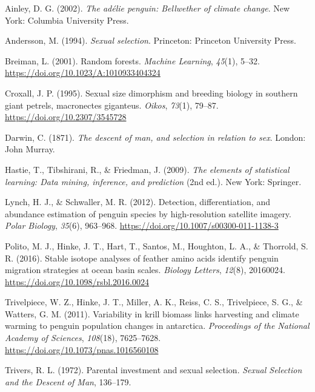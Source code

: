 \documentclass[
]{agujournal2019}
\newlength{\cslhangindent}
\newenvironment{CSLReferences}[2] %
 {\begin{list}{}{%
  \setlength{\itemindent}{0pt}
  \setlength{\leftmargin}{0pt}
  \setlength{\parsep}{0pt}
  \ifodd #1
   \setlength{\leftmargin}{\cslhangindent}
   \setlength{\itemindent}{-1\cslhangindent}
  \fi
  \setlength{\itemsep}{#2\baselineskip}}}
 {\end{list}}
\begin{document}
\label{refs}
\begin{CSLReferences}{1}{0}
Ainley, D. G. (2002). \emph{The ad{é}lie penguin: Bellwether of climate
change}. New York: Columbia University Press.

Andersson, M. (1994). \emph{Sexual selection}. Princeton: Princeton
University Press.

Breiman, L. (2001). Random forests. \emph{Machine Learning},
\emph{45}(1), 5--32. \url{https://doi.org/10.1023/A:1010933404324}

Croxall, J. P. (1995). Sexual size dimorphism and breeding biology in
southern giant petrels, macronectes giganteus. \emph{Oikos},
\emph{73}(1), 79--87. \url{https://doi.org/10.2307/3545728}

Darwin, C. (1871). \emph{The descent of man, and selection in relation
to sex}. London: John Murray.

Hastie, T., Tibshirani, R., \& Friedman, J. (2009). \emph{The elements
of statistical learning: Data mining, inference, and prediction} (2nd
ed.). New York: Springer.

Lynch, H. J., \& Schwaller, M. R. (2012). Detection, differentiation,
and abundance estimation of penguin species by high-resolution satellite
imagery. \emph{Polar Biology}, \emph{35}(6), 963--968.
\url{https://doi.org/10.1007/s00300-011-1138-3}

Polito, M. J., Hinke, J. T., Hart, T., Santos, M., Houghton, L. A., \&
Thorrold, S. R. (2016). Stable isotope analyses of feather amino acids
identify penguin migration strategies at ocean basin scales.
\emph{Biology Letters}, \emph{12}(8), 20160024.
\url{https://doi.org/10.1098/rsbl.2016.0024}

Trivelpiece, W. Z., Hinke, J. T., Miller, A. K., Reiss, C. S.,
Trivelpiece, S. G., \& Watters, G. M. (2011). Variability in krill
biomass links harvesting and climate warming to penguin population
changes in antarctica. \emph{Proceedings of the National Academy of
Sciences}, \emph{108}(18), 7625--7628.
\url{https://doi.org/10.1073/pnas.1016560108}

Trivers, R. L. (1972). Parental investment and sexual selection.
\emph{Sexual Selection and the Descent of Man}, 136--179.


\end{CSLReferences}
\end{document}
